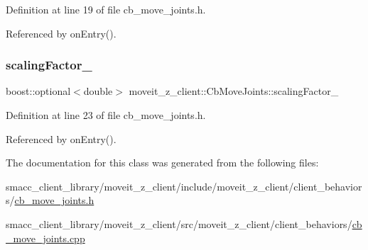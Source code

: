 Definition at line 19 of file cb\+\_\+move\+\_\+joints.\+h.



Referenced by on\+Entry().

\mbox{\label{classmoveit__z__client_1_1CbMoveJoints_aadb5410711e277fab3a637cb4835fb3b}} 
\subsubsection{\texorpdfstring{scaling\+Factor\+\_\+}{scalingFactor\_}}
{\footnotesize\ttfamily boost\+::optional$<$double$>$ moveit\+\_\+z\+\_\+client\+::\+Cb\+Move\+Joints\+::scaling\+Factor\+\_\+}



Definition at line 23 of file cb\+\_\+move\+\_\+joints.\+h.



Referenced by on\+Entry().



The documentation for this class was generated from the following files\+:\begin{DoxyCompactItemize}
\item 
smacc\+\_\+client\+\_\+library/moveit\+\_\+z\+\_\+client/include/moveit\+\_\+z\+\_\+client/client\+\_\+behaviors/\hyperlink{cb__move__joints_8h}{cb\+\_\+move\+\_\+joints.\+h}\item 
smacc\+\_\+client\+\_\+library/moveit\+\_\+z\+\_\+client/src/moveit\+\_\+z\+\_\+client/client\+\_\+behaviors/\hyperlink{cb__move__joints_8cpp}{cb\+\_\+move\+\_\+joints.\+cpp}\end{DoxyCompactItemize}
